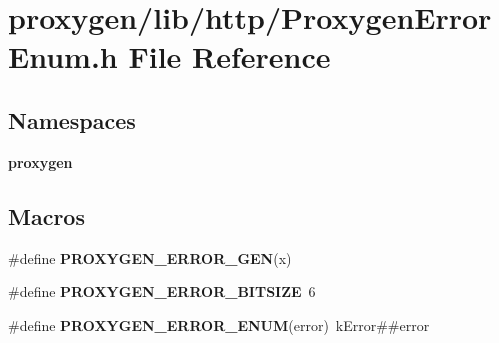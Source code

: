 \section{proxygen/lib/http/\+Proxygen\+Error\+Enum.h File Reference}
\label{ProxygenErrorEnum_8h}
\subsection*{Namespaces}
\begin{DoxyCompactItemize}
\item 
 {\bf proxygen}
\end{DoxyCompactItemize}
\subsection*{Macros}
\begin{DoxyCompactItemize}
\item 
\#define {\bf P\+R\+O\+X\+Y\+G\+E\+N\+\_\+\+E\+R\+R\+O\+R\+\_\+\+G\+EN}(x)
\item 
\#define {\bf P\+R\+O\+X\+Y\+G\+E\+N\+\_\+\+E\+R\+R\+O\+R\+\_\+\+B\+I\+T\+S\+I\+ZE}~6
\item 
\#define {\bf P\+R\+O\+X\+Y\+G\+E\+N\+\_\+\+E\+R\+R\+O\+R\+\_\+\+E\+N\+UM}(error)~k\+Error\#\#error
\end{DoxyCompactItemize}
